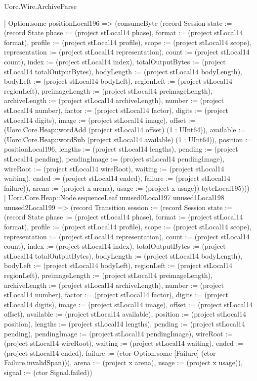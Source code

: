 \begin{lexlean}{Uorc.Wire.ArchiveParse}
\begin{semanticmodule}
{                | Option.some positionLocal196 => (consumeByte (record Session {state := (record State {phase := (project stLocal14 phase), format := (project stLocal14 format), profile := (project stLocal14 profile), scope := (project stLocal14 scope), representation := (project stLocal14 representation), count := (project stLocal14 count), index := (project stLocal14 index), totalOutputBytes := (project stLocal14 totalOutputBytes), bodyLength := (project stLocal14 bodyLength), bodyLeft := (project stLocal14 bodyLeft), regionLeft := (project stLocal14 regionLeft), preimageLength := (project stLocal14 preimageLength), archiveLength := (project stLocal14 archiveLength), number := (project stLocal14 number), factor := (project stLocal14 factor), digits := (project stLocal14 digits), image := (project stLocal14 image), offset := (Uorc.Core.Heap::wordAdd (project stLocal14 offset) (1 : UInt64)), available := (Uorc.Core.Heap::wordSub (project stLocal14 available) (1 : UInt64)), position := positionLocal196, lengths := (project stLocal14 lengths), pending := (project stLocal14 pending), pendingImage := (project stLocal14 pendingImage), wireRoot := (project stLocal14 wireRoot), waiting := (project stLocal14 waiting), ended := (project stLocal14 ended), failure := (project stLocal14 failure)}), arena := (project x arena), usage := (project x usage)}) byteLocal195)))
            | Uorc.Core.Heap::Node.sequenceLeaf unused0Local197 unused1Local198 unused2Local199 => (record Transition {session := (record Session {state := (record State {phase := (project stLocal14 phase), format := (project stLocal14 format), profile := (project stLocal14 profile), scope := (project stLocal14 scope), representation := (project stLocal14 representation), count := (project stLocal14 count), index := (project stLocal14 index), totalOutputBytes := (project stLocal14 totalOutputBytes), bodyLength := (project stLocal14 bodyLength), bodyLeft := (project stLocal14 bodyLeft), regionLeft := (project stLocal14 regionLeft), preimageLength := (project stLocal14 preimageLength), archiveLength := (project stLocal14 archiveLength), number := (project stLocal14 number), factor := (project stLocal14 factor), digits := (project stLocal14 digits), image := (project stLocal14 image), offset := (project stLocal14 offset), available := (project stLocal14 available), position := (project stLocal14 position), lengths := (project stLocal14 lengths), pending := (project stLocal14 pending), pendingImage := (project stLocal14 pendingImage), wireRoot := (project stLocal14 wireRoot), waiting := (project stLocal14 waiting), ended := (project stLocal14 ended), failure := (ctor Option.some [Failure] (ctor Failure.invalidSpan))}), arena := (project x arena), usage := (project x usage)}), signal := (ctor Signal.failed)})
}
\end{semanticmodule}
\end{lexlean}
